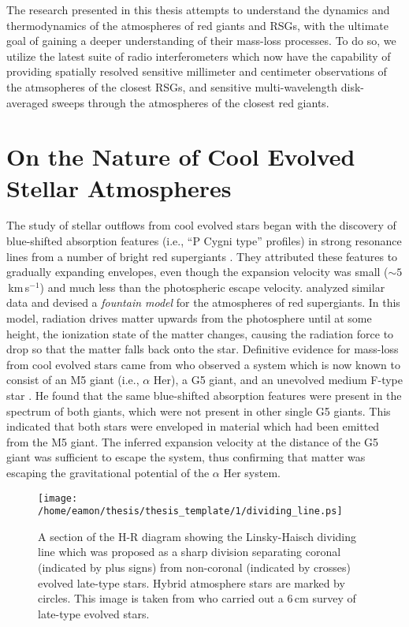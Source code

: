 The research presented in this thesis attempts to understand the dynamics and thermodynamics of the atmospheres of red giants and RSGs, with the ultimate goal of gaining a deeper understanding of their mass-loss processes. To do so, we utilize the latest suite of radio interferometers which now have the capability of providing spatially resolved sensitive millimeter and centimeter observations of the atmsopheres of the closest RSGs, and sensitive multi-wavelength disk-averaged sweeps through the atmospheres of the closest red giants.

\section{On the Nature of Cool Evolved Stellar Atmospheres}\label{sec:1.2}
The study of stellar outflows from cool evolved stars began with the discovery of blue-shifted absorption features (i.e., ``P Cygni type'' profiles) in strong resonance lines from a number of bright red supergiants \citep{adams_1935}. They attributed these features to gradually expanding envelopes, even though the expansion velocity was small ($\sim 5$\,km\,s$^{-1}$) and much less than the photospheric escape velocity. \cite{spitzer_1939} analyzed similar data and devised a \textit{fountain model} for the atmospheres of red supergiants. In this model, radiation drives matter upwards from the photosphere until at some height, the ionization state of the matter changes, causing the radiation force to drop so that the matter falls back onto the star. Definitive evidence for mass-loss from cool evolved stars came from \cite{deutsch_1956} who observed a system which is now known to consist of an M5 giant (i.e., $\alpha$ Her), a G5 giant, and an unevolved medium F-type star \citep{reimers_1977}. He found that the same blue-shifted absorption features were present in the spectrum of both giants, which were not present in other single G5 giants. This indicated that both stars were enveloped in material which had been emitted from the M5 giant. The inferred expansion velocity at the distance of the G5 giant was sufficient to escape the system, thus confirming that matter was escaping the gravitational potential of the $\alpha$ Her system.

\begin{figure}[hbt!]
\centering 
          \texttt{[image: /home/eamon/thesis/thesis\_template/1/dividing\_line.ps]}
\caption[The Linsky-Haisch dividing line]{A section of the H-R diagram showing the Linsky-Haisch dividing line which was proposed as a sharp division separating coronal (indicated by plus signs) from non-coronal (indicated by crosses) evolved late-type stars. Hybrid atmosphere stars are marked by circles. This image is taken from \cite{drake_1986} who carried out a 6\,cm survey of late-type evolved stars.}
\label{fig:1.2.1}
\end{figure}

